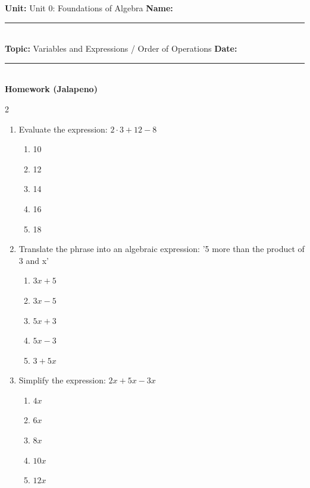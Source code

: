 \documentclass[10pt]{article}
\begin{document}
\enlargethispage{2.5cm}

\begin{tcolorbox}[colback=mainblue!5, colframe=mainblue, sharp corners, boxrule=0.5pt]
    \small \textbf{Unit:} Unit 0: Foundations of Algebra \hfill \textbf{Name:} \rule{3cm}{0.4pt} \\
    \small \textbf{Topic:} Variables and Expressions / Order of Operations \hfill \textbf{Date:} \rule{2cm}{0.4pt} \\
    \centering \textbf{\large Homework (Jalapeno)}
\end{tcolorbox}

\vspace{0.2cm}

\begin{multicols}{2}
\begin{enumerate}[label=\textbf{Q\arabic*.}, leftmargin=*, itemsep=6pt, parsep=0pt]

  \item \small Evaluate the expression: $2 \cdot 3 + 12 - 8$
  \begin{enumerate}[label=(\Alph*), leftmargin=0.6cm, nosep, itemsep=2pt]
    \item 10
    \item 12
    \item 14
    \item 16
    \item 18
  \end{enumerate}

  \item \small Translate the phrase into an algebraic expression: '5 more than the product of 3 and x'
  \begin{enumerate}[label=(\Alph*), leftmargin=0.6cm, nosep, itemsep=2pt]
    \item $3x + 5$
    \item $3x - 5$
    \item $5x + 3$
    \item $5x - 3$
    \item $3 + 5x$
  \end{enumerate}

  \item \small Simplify the expression: $2x + 5x - 3x$
  \begin{enumerate}[label=(\Alph*), leftmargin=0.6cm, nosep, itemsep=2pt]
    \item $4x$
    \item $6x$
    \item $8x$
    \item $10x$
    \item $12x$
  \end{enumerate}


\end{enumerate}
\end{multicols}
\end{document}
